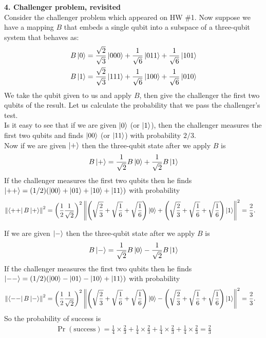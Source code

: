 \documentclass{article}
\theoremstyle{definition}
\newcommand{\f}[2]{\frac{#1}{#2}}
\newcommand{\lp}{\left(}
\newcommand{\rp}{\right)}
\begin{document}
\noindent \textbf{4. Challenger problem, revisited}\\

\noindent Consider the challenger problem which appeared on HW \#1.  Now suppose we have a mapping $B$ that embeds a single qubit into a subspace of a three-qubit system that behaves as:
\begin{align*}
	&B\ket{0} = \f{\sqrt{2}}{\sqrt{3}} \ket{000} + \f{1}{\sqrt{6}} \ket{011} + \f{1}{\sqrt{6}} \ket{101}\\
	&B\ket{1} = \f{\sqrt{2}}{\sqrt{3}} \ket{111} + \f{1}{\sqrt{6}} \ket{100} + \f{1}{\sqrt{6}} \ket{010}
\end{align*}
We take the qubit given to us and apply $B$, then give the challenger the first two qubits of the result. Let us calculate the probability that we pass the challenger's test. \\

Is it easy to see that if we are given $\ket{0}$ (or $\ket{1}$), then the challenger measures the first two qubits and finds $\ket{00}$ (or $\ket{11}$) with probability $2/3$. \\

Now if we are given $\ket{+}$ then the three-qubit state after we apply $B$ is 
\begin{align*}
	B\ket{+} = \f{1}{\sqrt{2}}B\ket{0} + \f{1}{\sqrt{2}} B\ket{1} 
\end{align*}
If the challenger measures the first two qubits then he finds $\ket{++} = (1/2)(\ket{00} + \ket{01} + \ket{10} + \ket{11})$ with probability
\begin{align*}
	\norm{\bra{++}B\ket{+}}^2 
	&= \lp \f{1}{2}\f{1}{\sqrt{2}} \rp^2 \norm{\lp \sqrt{\f{2}{3}} + \sqrt{\f{1}{6}}  + \sqrt{\f{1}{6}}\rp \ket{0} + \lp \sqrt{\f{2}{3}} + \sqrt{\f{1}{6}}  + \sqrt{\f{1}{6}}\rp \ket{1}}^2 = \f{2}{3}.
\end{align*} 


If we are given $\ket{-}$ then the three-qubit state after we apply $B$ is 
\begin{align*}
	B\ket{-} = \f{1}{\sqrt{2}}B\ket{0} - \f{1}{\sqrt{2}} B\ket{1} 
\end{align*}
If the challenger measures the first two qubits then he finds $\ket{--} = (1/2)(\ket{00} - \ket{01} - \ket{10} + \ket{11})$ with probability
\begin{align*}
	\norm{\bra{--}B\ket{-}}^2 
	&= \lp \f{1}{2}\f{1}{\sqrt{2}} \rp^2 \norm{\lp \sqrt{\f{2}{3}} + \sqrt{\f{1}{6}}  + \sqrt{\f{1}{6}}\rp \ket{0} - \lp \sqrt{\f{2}{3}} + \sqrt{\f{1}{6}}  + \sqrt{\f{1}{6}}\rp \ket{1}}^2 = \f{2}{3}.
\end{align*} 
So the probability of success is
\begin{align*}
	\Pr(\text{success}) = \f{1}{4} \times \f{2}{3} +  \f{1}{4} \times \f{2}{3} +  \f{1}{4} \times \f{2}{3} +  \f{1}{4} \times \f{2}{3}  = \boxed{\f{2}{3}}
\end{align*}
\end{document}
